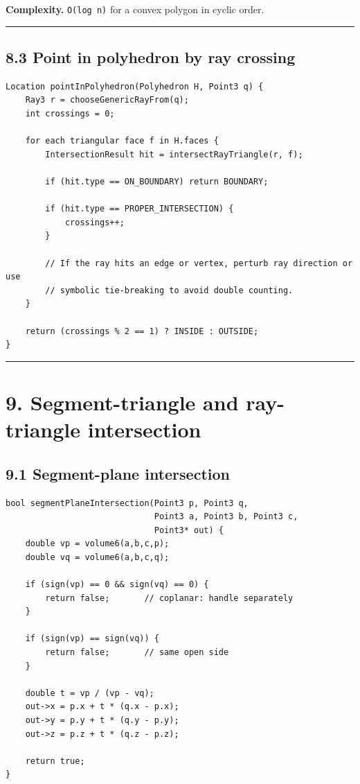 \documentclass[11pt]{article}
\begin{document}
\textbf{Complexity.} \texttt{O(log n)} for a convex
polygon in cyclic order.

\begin{center}\rule{0.5\linewidth}{0.5pt}\end{center}

\subsection{8.3 Point in polyhedron by ray
crossing}\label{point-in-polyhedron-by-ray-crossing}

\begin{verbatim}
Location pointInPolyhedron(Polyhedron H, Point3 q) {
    Ray3 r = chooseGenericRayFrom(q);
    int crossings = 0;

    for each triangular face f in H.faces {
        IntersectionResult hit = intersectRayTriangle(r, f);

        if (hit.type == ON_BOUNDARY) return BOUNDARY;

        if (hit.type == PROPER_INTERSECTION) {
            crossings++;
        }

        // If the ray hits an edge or vertex, perturb ray direction or use
        // symbolic tie-breaking to avoid double counting.
    }

    return (crossings % 2 == 1) ? INSIDE : OUTSIDE;
}
\end{verbatim}

\begin{center}\rule{0.5\linewidth}{0.5pt}\end{center}

\section{9. Segment-triangle and ray-triangle
intersection}\label{segment-triangle-and-ray-triangle-intersection}

\subsection{9.1 Segment-plane
intersection}\label{segment-plane-intersection}

\begin{verbatim}
bool segmentPlaneIntersection(Point3 p, Point3 q,
                              Point3 a, Point3 b, Point3 c,
                              Point3* out) {
    double vp = volume6(a,b,c,p);
    double vq = volume6(a,b,c,q);

    if (sign(vp) == 0 && sign(vq) == 0) {
        return false;       // coplanar: handle separately
    }

    if (sign(vp) == sign(vq)) {
        return false;       // same open side
    }

    double t = vp / (vp - vq);
    out->x = p.x + t * (q.x - p.x);
    out->y = p.y + t * (q.y - p.y);
    out->z = p.z + t * (q.z - p.z);

    return true;
}
\end{verbatim}
\end{document}
